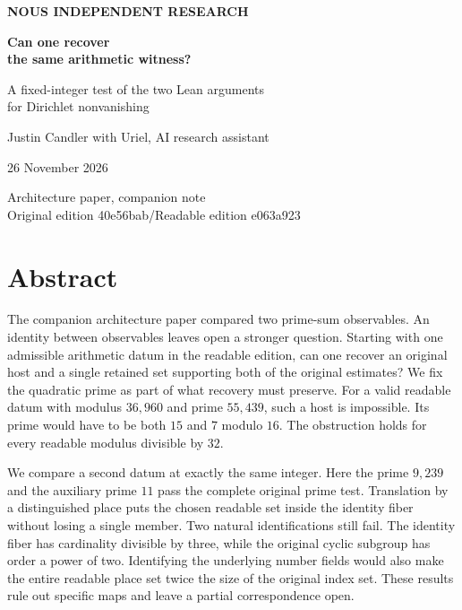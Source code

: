 \documentclass[12pt,letterpaper]{article}
\begin{document}
\thispagestyle{empty}
\begin{center}\vspace*{.55in}
{\sffamily\small\bfseries\color{accent}NOUS INDEPENDENT RESEARCH}\par\vspace{.58in}
{\fontsize{32}{38}\selectfont\bfseries\color{ink}Can one recover\\the same arithmetic witness?}\par\vspace{.24in}
{\Large A fixed-integer test of the two Lean arguments\\for Dirichlet nonvanishing}\par\vspace{.32in}
\par\vspace{.42in}
{\large Justin Candler with Uriel, AI research assistant}\par 26 November 2026
\end{center}\vfill\begin{center}\small\sffamily Architecture paper, companion note\\Original edition 40e56bab\enspace /\enspace Readable edition e063a923\end{center}
\clearpage
\section*{Abstract}
The companion architecture paper compared two prime-sum observables. An identity between observables leaves open a stronger question. Starting with one admissible arithmetic datum in the readable edition, can one recover an original host and a single retained set supporting both of the original estimates? We fix the quadratic prime as part of what recovery must preserve. For a valid readable datum with modulus $36{,}960$ and prime $55{,}439$, such a host is impossible. Its prime would have to be both $15$ and $7$ modulo $16$. The obstruction holds for every readable modulus divisible by $32$.

We compare a second datum at exactly the same integer. Here the prime $9{,}239$ and the auxiliary prime $11$ pass the complete original prime test. Translation by a distinguished place puts the chosen readable set inside the identity fiber without losing a single member. Two natural identifications still fail. The identity fiber has cardinality divisible by three, while the original cyclic subgroup has order a power of two. Identifying the underlying number fields would also make the entire readable place set twice the size of the original index set. These results rule out specific maps and leave a partial correspondence open.
\end{document}
